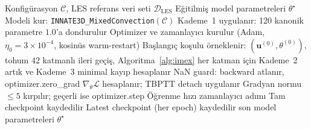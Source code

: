\begin{algorithm}[H]
\caption{INNATE eğitim iş akışı (Kademe~1+2+3 disiplini)}
\label{alg:training}
\begin{algorithmic}[1]
\Require Konfigürasyon $\mathcal{C}$, LES referans veri seti $\mathcal{D}_{\mathrm{LES}}$
\Ensure Eğitilmiş model parametreleri $\theta^{\star}$
\State Modeli kur: \texttt{INNATE3D\_MixedConvection}$(\mathcal{C})$
\State Kademe~1 uygulanır: 120 kanonik parametre $1.0$'a dondurulur 
\State Optimizer ve zamanlayıcı kurulur (Adam, $\eta_{0}=3\times 10^{-4}$, kosinüs warm-restart)
\State Başlangıç koşulu örneklenir: $(\mathbf{u}^{(0)}, \theta^{(0)})$, tohum $42$
         katmanlı ileri geçiş, Algoritma~\ref{alg:imex} her katman için
        \State Kademe~2 artık ve Kademe~3 minimal kayıp hesaplanır 
            \State NaN guard: backward atlanır, optimizer.zero\_grad
        \Else
            \State $\nabla_{\theta}\mathcal{L}$ hesaplanır; TBPTT detach uygulanır
        \EndIf
    \EndFor
    \State Gradyan normu $\leq 5$ kırpılır; geçerli ise optimizer.step
    \State Öğrenme hızı zamanlayıcı adımı
     \State Tam checkpoint kaydedilir \EndIf
    \State Latest checkpoint (her epoch) kaydedilir
\EndFor
\State \Return son model parametreleri $\theta^{\star}$
\end{algorithmic}
\end{algorithm}
